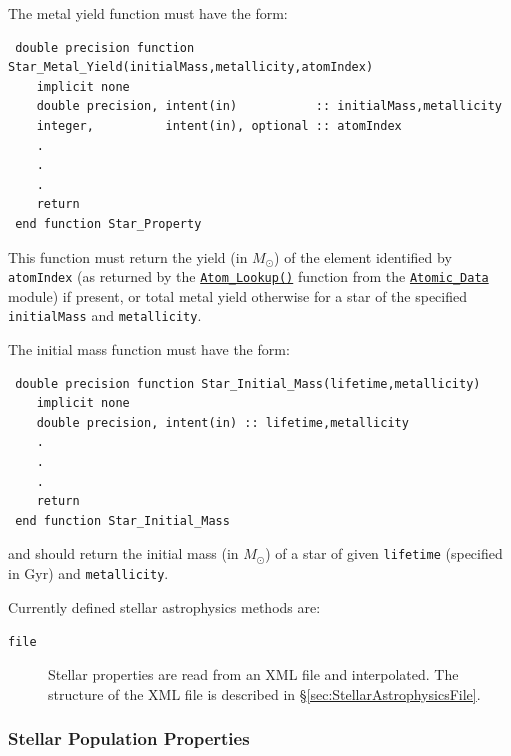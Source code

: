 The metal yield function must have the form:
\begin{verbatim}
 double precision function Star_Metal_Yield(initialMass,metallicity,atomIndex)
    implicit none
    double precision, intent(in)           :: initialMass,metallicity
    integer,          intent(in), optional :: atomIndex
    .
    .
    .
    return
 end function Star_Property
\end{verbatim}
This function must return the yield (in $M_\odot$) of the element identified by {\tt atomIndex} (as returned by the \hyperlink{atomic.data.F90:atomic_data:atom_lookup}{{\tt Atom\_Lookup()}} function from the \hyperlink{atomic.data.F90:atomic_data}{{\tt Atomic\_Data}} module) if present, or total metal yield otherwise for a star of the specified {\tt initialMass} and {\tt metallicity}.

The initial mass function must have the form:
\begin{verbatim}
 double precision function Star_Initial_Mass(lifetime,metallicity)
    implicit none
    double precision, intent(in) :: lifetime,metallicity
    .
    .
    .
    return
 end function Star_Initial_Mass
\end{verbatim}
and should return the initial mass (in $M_\odot$) of a star of given {\tt lifetime} (specified in Gyr) and {\tt metallicity}.

Currently defined stellar astrophysics methods are:
\begin{description}
 \item [{\tt file}] Stellar properties are read from an XML file and interpolated. The structure of the XML file is described in \S\ref{sec:StellarAstrophysicsFile}.
\end{description}

\subsubsection{Stellar Population Properties}

